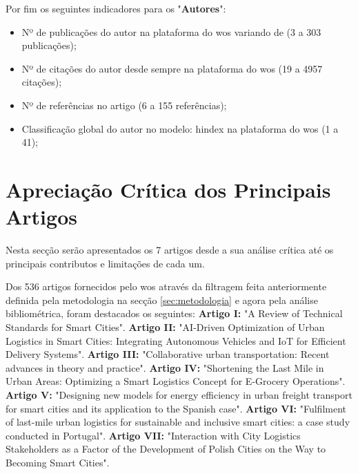 Por fim  os seguintes indicadores para os "\textbf{Autores}":
\begin{itemize}
    \item Nº de publicações do autor na plataforma do \gls{wos} variando de (3 a 303 publicações);
    \item Nº de citações do autor desde sempre na plataforma do \gls{wos} (19 a 4957 citações);
    \item Nº de referências no artigo (6 a 155 referências);
    \item Classificação global do autor no modelo: \gls{hindex} na plataforma do \gls{wos} (1 a 41);
\end{itemize}
\newpage

\section{Apreciação Crítica dos Principais Artigos}
\label{sec:apreciacao_critica_principais_artigos}

Nesta secção serão apresentados os 7 artigos desde a sua análise crítica até os principais contributos e limitações de cada um.

Dos 536 artigos fornecidos pelo \gls{wos} através da filtragem feita anteriormente definida pela metodologia na secção \ref{sec:metodologia} e agora pela análise bibliométrica, foram destacados os seguintes:
\textbf{Artigo I:}  "A Review of Technical Standards for Smart Cities"\cite{article}.
\textbf{Artigo II:} "AI-Driven Optimization of Urban Logistics in Smart Cities: Integrating Autonomous Vehicles and IoT for Efficient Delivery Systems"\cite{su162411265}.
\textbf{Artigo III:} "Collaborative urban transportation: Recent advances in theory and practice"\cite{CLEOPHAS2019801}.
\textbf{Artigo IV:} "Shortening the Last Mile in Urban Areas: Optimizing a Smart Logistics Concept for E-Grocery Operations"\cite{article2}.
\textbf{Artigo V:} "Designing new models for energy efficiency in urban freight transport for smart cities and its application to the Spanish case"\cite{NAVARRO2016314}.
\textbf{Artigo VI:} "Fulfilment of last-mile urban logistics for sustainable and inclusive smart cities: a case study conducted in Portugal"\cite{Correia02062024}.
\textbf{Artigo VII:} "Interaction with City Logistics Stakeholders as a Factor of the Development of Polish Cities on the Way to Becoming Smart Cities"\cite{en15114103}.


